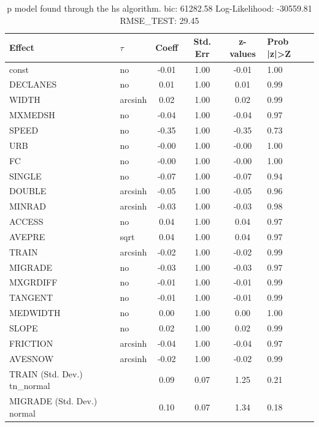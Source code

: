 \begin{table}
	\caption{p model found through the hs algorithm. bic: 61282.58 Log-Likelihood: -30559.81 RMSE_TEST: 29.45}
	\begin{center}
		\begin{tabular}{|l|l|c|c|c|l|}
			\hline
			Effect & $\tau$ & Coeff & Std. Err & z-values & Prob |z|>Z \\
			\hline
			const & no & -0.01 & 1.00 & -0.01 & 1.00 \\
			\hline
			DECLANES & no & 0.01 & 1.00 & 0.01 & 0.99 \\
			\hline
			WIDTH & arcsinh & 0.02 & 1.00 & 0.02 & 0.99 \\
			\hline
			MXMEDSH & no & -0.04 & 1.00 & -0.04 & 0.97 \\
			\hline
			SPEED & no & -0.35 & 1.00 & -0.35 & 0.73 \\
			\hline
			URB & no & -0.00 & 1.00 & -0.00 & 1.00 \\
			\hline
			FC & no & -0.00 & 1.00 & -0.00 & 1.00 \\
			\hline
			SINGLE & no & -0.07 & 1.00 & -0.07 & 0.94 \\
			\hline
			DOUBLE & arcsinh & -0.05 & 1.00 & -0.05 & 0.96 \\
			\hline
			MINRAD & arcsinh & -0.03 & 1.00 & -0.03 & 0.98 \\
			\hline
			ACCESS & no & 0.04 & 1.00 & 0.04 & 0.97 \\
			\hline
			AVEPRE & sqrt & 0.04 & 1.00 & 0.04 & 0.97 \\
			\hline
			TRAIN & arcsinh & -0.02 & 1.00 & -0.02 & 0.99 \\
			\hline
			MIGRADE & no & -0.03 & 1.00 & -0.03 & 0.97 \\
			\hline
			MXGRDIFF & no & -0.01 & 1.00 & -0.01 & 0.99 \\
			\hline
			TANGENT & no & -0.01 & 1.00 & -0.01 & 0.99 \\
			\hline
			MEDWIDTH & no & 0.00 & 1.00 & 0.00 & 1.00 \\
			\hline
			SLOPE & no & 0.02 & 1.00 & 0.02 & 0.99 \\
			\hline
			FRICTION & arcsinh & -0.04 & 1.00 & -0.04 & 0.97 \\
			\hline
			AVESNOW & arcsinh & -0.02 & 1.00 & -0.02 & 0.99 \\
			\hline
			TRAIN (Std. Dev.) tn_normal &  & 0.09 & 0.07 & 1.25 & 0.21 \\
			\hline
			MIGRADE (Std. Dev.) normal &  & 0.10 & 0.07 & 1.34 & 0.18 \\

\end{tabular}
\end{center}
\end{table}
